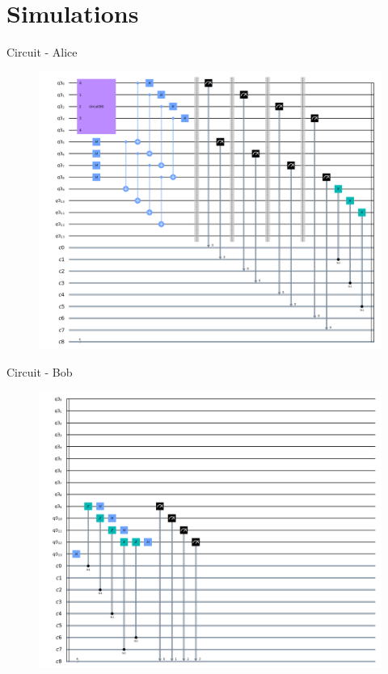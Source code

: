 \section{Simulations}
\begin{frame}{Circuit - Alice}
    \begin{figure}
        \centering
        \includegraphics[width=.8\linewidth]{pics/alice.png}
   
        \label{fig:my_label}
    \end{figure}
\end{frame}
\begin{frame}{Circuit - Bob}
    \begin{figure}
        \centering
        \includegraphics[width=0.8\linewidth]{pics/bob.png}
   
        \label{fig:my_label}
    \end{figure}
\end{frame}